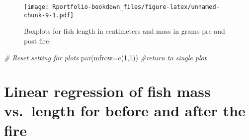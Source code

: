 \documentclass[
]{book}
\newenvironment{Shaded}{\begin{snugshade}}{\end{snugshade}}
\newcommand{\AttributeTok}[1]{\textcolor[rgb]{0.77,0.63,0.00}{#1}}
\newcommand{\CommentTok}[1]{\textcolor[rgb]{0.56,0.35,0.01}{\textit{#1}}}
\newcommand{\DecValTok}[1]{\textcolor[rgb]{0.00,0.00,0.81}{#1}}
\newcommand{\FunctionTok}[1]{\textcolor[rgb]{0.00,0.00,0.00}{#1}}
\newcommand{\NormalTok}[1]{#1}
\newcommand{\SpecialCharTok}[1]{\textcolor[rgb]{0.00,0.00,0.00}{#1}}
\newcommand{\StringTok}[1]{\textcolor[rgb]{0.31,0.60,0.02}{#1}}
\begin{document}
\begin{Shaded}
\end{Shaded}

\begin{figure}
\centering
\texttt{[image: Rportfolio-bookdown\_files/figure-latex/unnamed-chunk-9-1.pdf]}
\caption{\label{fig:unnamed-chunk-9}Boxplots for fish length in centimeters and mass in grams pre and post fire.}
\end{figure}

\begin{Shaded}
\begin{Highlighting}[]
\CommentTok{\# Reset setting for plots}
\FunctionTok{par}\NormalTok{(}\AttributeTok{mfrow=}\FunctionTok{c}\NormalTok{(}\DecValTok{1}\NormalTok{,}\DecValTok{1}\NormalTok{)) }\CommentTok{\#return to single plot}
\end{Highlighting}
\end{Shaded}

\hypertarget{linear-regression-of-fish-mass-vs.-length-for-before-and-after-the-fire}{%
\section{Linear regression of fish mass vs.~length for before and after the fire}\label{linear-regression-of-fish-mass-vs.-length-for-before-and-after-the-fire}}
\end{document}
